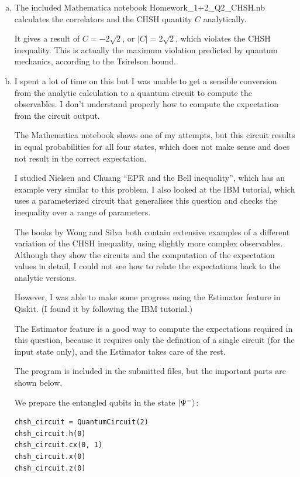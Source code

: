 \documentclass[12pt]{extarticle}
\begin{document}
\begin{enumerate}[(a)]
\item
The included Mathematica notebook Homework\_1+2\_Q2\_CHSH.nb calculates the correlators and the CHSH quantity $C$ analytically.

It gives a result of $C = -2\sqrt{2}$, or $|C| = 2\sqrt{2}$, which violates the CHSH inequality.
This is actually the maximum violation predicted by quantum mechanics, according to the Tsirelson bound.

\item
I spent a lot of time on this but I was unable to get a sensible conversion from the analytic calculation to a quantum circuit
to compute the observables.
I don't understand properly how to compute the expectation from the circuit output.

The Mathematica notebook shows one of my attempts, but this circuit results in equal probabilities for all four states, which does not make sense and does not result in the correct expectation.

I studied Nielsen and Chuang\cite{nielsen2016} ``EPR and the Bell inequality'', which has an example very similar to this problem.
I also looked at the IBM tutorial\cite{ibm_chsh}, which uses a parameterized circuit that generalises this question and checks the inequality over a range of parameters.

The books by Wong\cite{wong2022} and Silva\cite{silva2024} both contain extensive examples of a different variation of the CHSH inequality, using slightly more complex observables.
Although they show the circuits and the computation of the expectation values in detail, I could not see how to relate the expectations back to the analytic versions.

However, I was able to make some progress using the Estimator feature in Qiskit.
(I found it by following the IBM tutorial.)

The Estimator feature is a good way to compute the expectations required in this question,
because it requires only the definition of a single circuit (for the input state only),
and the Estimator takes care of the rest.

The program is included in the submitted files, but the important parts are shown below.

We prepare the entangled qubits in the state $\ket{\Psi^{-}}$:
\begin{verbatim}
chsh_circuit = QuantumCircuit(2)
chsh_circuit.h(0)
chsh_circuit.cx(0, 1)
chsh_circuit.x(0)
chsh_circuit.z(0)
\end{verbatim}


\end{enumerate}
\end{document}
